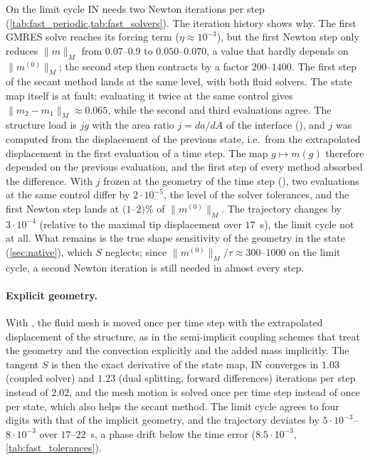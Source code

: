 \documentclass[11pt,a4paper]{article}
\theoremstyle{definition}
\theoremstyle{remark}
\newcommand{\M}{M}
\begin{document}
On the limit cycle IN needs two Newton iterations per step (\cref{tab:fast_periodic,tab:fast_solvers}).
The iteration history shows why. The first GMRES solve reaches its forcing term ($\eta\approx10^{-3}$),
but the first Newton step only reduces $\|m\|_{\M}$ from $0.07$--$0.9$ to $0.050$--$0.070$, a value
that hardly depends on $\|m^{(0)}\|_{\M}$; the second step then contracts by a factor $200$--$1400$.
The first step of the secant method lands at the same level, with both fluid solvers. The state map
itself is at fault: evaluating it twice at the same control gives $\|m_2-m_1\|_{\M}\approx0.065$,
while the second and third evaluations agree. The structure load is $jg$ with the area ratio
$j=da/dA$ of the interface (), and $j$ was computed from the displacement of
the previous state, i.e.\ from the extrapolated displacement in the first evaluation of a time step.
The map $g\mapsto m(g)$ therefore depended on the previous evaluation, and the first step of every
method absorbed the difference. With $j$ frozen at the geometry of the time step
(), two evaluations at the same control differ by $2\cdot10^{-5}$,
the level of the solver tolerances, and the first Newton step lands at $(1$--$2)\%$ of
$\|m^{(0)}\|_{\M}$. The trajectory changes by $3\cdot10^{-4}$ (relative to the maximal tip
displacement over $17$~s), the limit cycle not at all. What remains is the true shape sensitivity
of the geometry in the state (\cref{sec:native}), which $S$ neglects; since
$\|m^{(0)}\|_{\M}/\tau\approx300$--$1000$ on the limit cycle, a second Newton iteration is still
needed in almost every step.

\paragraph{Explicit geometry.} With , the fluid mesh is moved once per
time step with the extrapolated displacement of the structure, as in the semi-implicit coupling
schemes that treat the geometry and the convection explicitly and the added mass implicitly. The
tangent $S$ is then the exact derivative of the state map, IN converges in $1.03$ (coupled solver)
and $1.23$ (dual splitting, forward differences) iterations per step instead of $2.02$, and the
mesh motion is solved once per time step instead of once per state, which also helps the secant
method. The limit cycle agrees to four digits with that of the implicit geometry, and the trajectory
deviates by $5\cdot10^{-3}$--$8\cdot10^{-3}$ over $17$--$22$~s, a phase drift below the time error
($8.5\cdot10^{-3}$, \cref{tab:fast_tolerances}).
\end{document}
